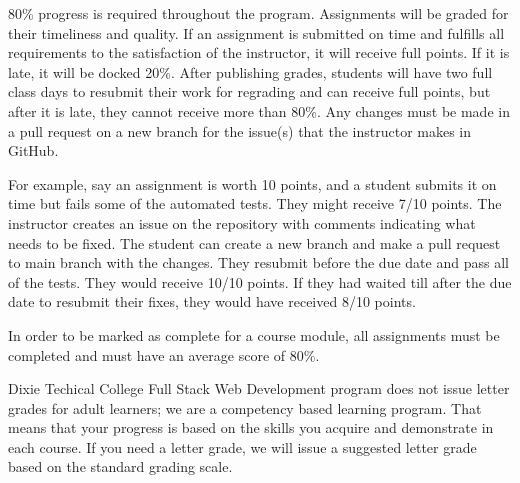 80\% progress is required throughout the program. Assignments will be graded for their timeliness
and quality. If an assignment is submitted on time and fulfills all requirements to the satisfaction
of the instructor, it will receive full points. If it is late, it will be docked 20\%. After publishing
grades, students will have two full class days to resubmit their work for regrading and
can receive full points, but after it is late, they cannot receive more than 80\%. Any changes must
be made in a pull request on a new branch for the issue(s) that the instructor makes in GitHub.
\par
\bigskip
For example, say an assignment is worth 10 points, and a student submits it on time but fails some of the
automated tests. They might receive 7/10 points. The instructor creates an issue on the repository with
comments indicating what needs to be fixed. The student can create a new branch and make a pull request to
main branch with the changes. They resubmit before the due date and pass all of the tests. They would receive
10/10 points. If they had waited till after the due date to resubmit their fixes, they would have received 8/10 points.
\par
\bigskip
In order to be marked as complete for a course module, all assignments must be completed and must have an
average score of 80\%.
\par
\bigskip
Dixie Techical College Full Stack Web Development program does not issue letter grades for adult learners; we are
a competency based learning program. That means that your progress is based on the skills you acquire
and demonstrate in each course. If you need a letter grade, we will issue a suggested letter grade based
on the standard grading scale.
